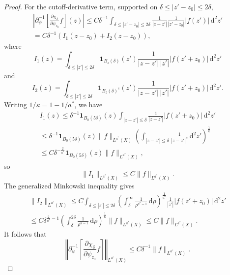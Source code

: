 \documentclass[a4paper,11pt]{article}
\newcommand{\pr}{\partial}
\newcommand{\psiz}{\psi_{z_0}}
\newcommand{\dd}{\,\text{d}}
\theoremstyle{plain}
\theoremstyle{definition}
\theoremstyle{remark}
\begin{document}
\begin{proof}
For the cutoff-derivative term, supported on $\delta\le |z'-z_0|\le2\delta$,
\begin{multline}
\left|\pr_\psi^{-1}\left[\frac{\pr \chi_\delta}{\pr\psiz} f  \right](z)\right|
\leq C\delta^{-1}\int_{\delta\leq|z'-z_0|\leq2\delta}\frac{1}{|z-z'|}\frac{1}{|z'-z_0|}|f(z')|\dd^2z'\\[5pt]
=C\delta^{-1}\left( I_1(z-z_0)+I_2(z-z_0)\right),
\end{multline}
where
\begin{equation}
I_1(z)=\int_{\delta\leq|z'|\leq2\delta}\mathbf{1}_{B_{z}(\delta)}(z')\frac{1}{|z-z'|\,|z'|}|f(z'+z_0)|\dd^2 z'
\end{equation}
and
\begin{equation}
I_2(z)=\int_{\delta\leq|z'|\leq2\delta}\mathbf{1}_{B_{z}(\delta)^c}(z')\frac{1}{|z-z'|\,|z'|}|f(z'+z_0)|\dd^2 z'.
\end{equation}
Writing $1/\kappa=1-1/a^*$, we have
\begin{multline}
I_1(z)\leq\delta^{-1}\mathbf{1}_{B_0(5\delta)}(z)\int_{|z-z'|\leq\delta}\frac{1}{|z-z'|}|f(z'+z_0)|\dd^2 z'\\[5pt]
\leq \delta^{-1}\mathbf{1}_{B_0(5\delta)}(z)\|f\|_{L^{a^*}(X)}\left(\int_{|z-z'|\leq\delta}\frac{1}{|z-z'|^\kappa}\dd^2 z'\right)^{\frac{1}{\kappa}}\\[5pt]
\leq C \delta^{-\frac{2}{a^*}}\mathbf{1}_{B_0(5\delta)}(z)\|f\|_{L^{a^*}(X)},
\end{multline}
so
\begin{equation}
\|I_1\|_{L^{a^*}(X)}\leq C\|f\|_{L^{a^*}(X)}.
\end{equation}
The generalized Minkowski inequality gives
\begin{multline}
\|I_2\|_{L^{a^*}(X)}\leq C\int_{\delta\leq|z'|\leq2\delta}\left(\int_{\delta}^\infty \frac{1}{\rho^{a^*-1}}\dd\rho\right)^{\frac{1}{a^*}}\frac{1}{|z'|}|f(z'+z_0)|\dd^2 z'\\[5pt]
\leq C\delta^{\frac{2}{a^*}-1}\left(\int_\delta^{2\delta} \frac{1}{\rho^{\kappa-1}}\dd\rho\right)^{\frac{1}{\kappa}} \|f\|_{L^{a^*}(X)}
\leq C \|f\|_{L^{a^*}(X)}.
\end{multline}
It follows that
\begin{equation}
\left\Vert\pr_\psi^{-1}\left[\frac{\pr \chi_\delta}{\pr\psiz} f  \right]\right\Vert_{L^{a^*}(X)}\leq C\delta^{-1}\|f\|_{L^{a^*}(X)}.
\end{equation}


\end{proof}
\end{document}
